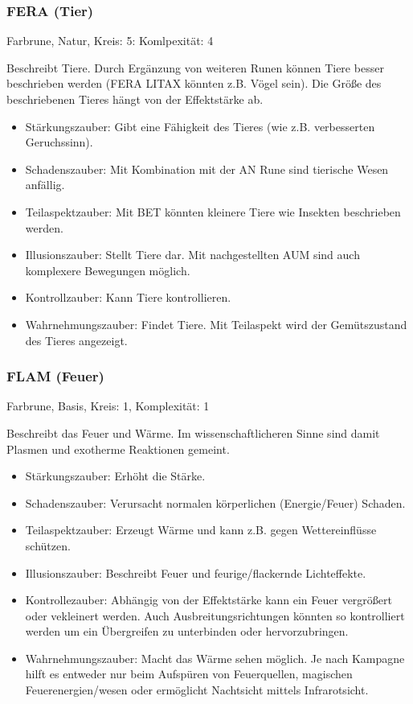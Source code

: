 \documentclass{article}
\begin{document}
\subsubsection{FERA (Tier)}

Farbrune, Natur, Kreis: 5: Komlpexität: 4

Beschreibt Tiere. Durch Ergänzung von weiteren Runen können Tiere besser beschrieben werden (FERA LITAX könnten z.B.
Vögel sein). Die Größe des beschriebenen Tieres hängt von der Effektstärke ab.

\begin{itemize}
\item Stärkungszauber: Gibt eine Fähigkeit des Tieres (wie z.B. verbesserten Geruchssinn).
\item Schadenszauber: Mit Kombination mit der AN Rune sind tierische Wesen anfällig.
\item Teilaspektzauber: Mit BET könnten kleinere Tiere wie Insekten beschrieben werden.
\item Illusionszauber: Stellt Tiere dar. Mit nachgestellten AUM sind auch komplexere Bewegungen möglich.
\item Kontrollzauber: Kann Tiere kontrollieren.
\item Wahrnehmungszauber: Findet Tiere. Mit Teilaspekt wird der Gemütszustand des Tieres angezeigt.
\end{itemize}

\subsubsection{FLAM (Feuer)}

Farbrune, Basis, Kreis: 1, Komplexität: 1

Beschreibt das Feuer und Wärme. Im wissenschaftlicheren Sinne sind damit Plasmen und exotherme Reaktionen gemeint.

\begin{itemize}
\item Stärkungszauber: Erhöht die Stärke.
\item Schadenszauber: Verursacht normalen körperlichen (Energie/Feuer) Schaden.
\item Teilaspektzauber: Erzeugt Wärme und kann z.B. gegen Wettereinflüsse schützen.
\item Illusionszauber: Beschreibt Feuer und feurige/flackernde Lichteffekte.
\item Kontrollezauber: Abhängig von der Effektstärke kann ein Feuer vergrößert oder vekleinert werden. Auch Ausbreitungsrichtungen könnten so kontrolliert werden um ein Übergreifen zu unterbinden oder hervorzubringen.
\item Wahrnehmungszauber: Macht das Wärme sehen möglich. Je nach Kampagne hilft es entweder nur beim Aufspüren von Feuerquellen, magischen Feuerenergien/wesen oder ermöglicht Nachtsicht mittels Infrarotsicht.
\end{itemize}
\end{document}
